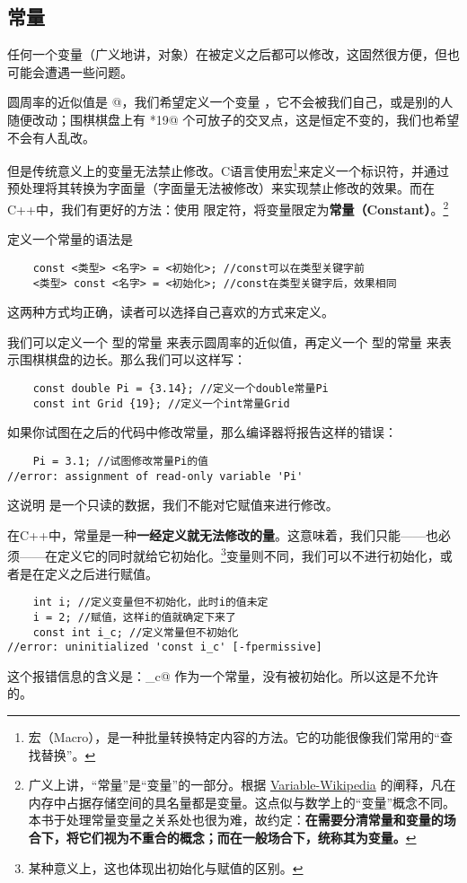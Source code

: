 \subsection*{常量}
任何一个变量（广义地讲，对象）在被定义之后都可以修改，这固然很方便，但也可能会遭遇一些问题。\par
圆周率的近似值是 @，我们希望定义一个变量 \lstinline@Pi@，它不会被我们自己，或是别的人随便改动；围棋棋盘上有 *19@ 个可放子的交叉点，这是恒定不变的，我们也希望不会有人乱改。\par
但是传统意义上的变量无法禁止修改。C语言使用宏\footnote{宏（Macro），是一种批量转换特定内容的方法。它的功能很像我们常用的``查找替换''。}来定义一个标识符，并通过预处理将其转换为字面量（字面量无法被修改）来实现禁止修改的效果。而在C++中，我们有更好的方法：使用 \lstinline@const@ 限定符，将变量限定为\textbf{常量（Constant）}。\footnote{广义上讲，``常量''是``变量''的一部分。根据 \href{https://en.wikipedia.org/wiki/Variable_(computer_science)}{Variable-Wikipedia} 的阐释，凡在内存中占据存储空间的具名量都是变量。这点似与数学上的``变量''概念不同。本书于处理常量变量之关系处也很为难，故约定：\textbf{在需要分清常量和变量的场合下，将它们视为不重合的概念；而在一般场合下，统称其为变量。}}\par
定义一个常量的语法是
\begin{lstlisting}
    const <类型> <名字> = <初始化>; //const可以在类型关键字前
    <类型> const <名字> = <初始化>; //const在类型关键字后，效果相同
\end{lstlisting}
这两种方式均正确，读者可以选择自己喜欢的方式来定义。\par
我们可以定义一个 \lstinline@double@ 型的常量 \lstinline@Pi@ 来表示圆周率的近似值，再定义一个 \lstinline@int@ 型的常量 \lstinline@Grid@ 来表示围棋棋盘的边长。那么我们可以这样写：
\begin{lstlisting}
    const double Pi = {3.14}; //定义一个double常量Pi
    const int Grid {19}; //定义一个int常量Grid
\end{lstlisting}
如果你试图在之后的代码中修改常量，那么编译器将报告这样的错误：
\begin{lstlisting}
    Pi = 3.1; //试图修改常量Pi的值
//error: assignment of read-only variable 'Pi'
\end{lstlisting}
这说明 \lstinline@Pi@ 是一个只读的数据，我们不能对它赋值来进行修改。\par
在C++中，常量是一种\textbf{一经定义就无法修改的量}。这意味着，我们只能——也必须——在定义它的同时就给它初始化。\footnote{某种意义上，这也体现出初始化与赋值的区别。}变量则不同，我们可以不进行初始化，或者是在定义之后进行赋值。
\begin{lstlisting}
    int i; //定义变量但不初始化，此时i的值未定
    i = 2; //赋值，这样i的值就确定下来了
    const int i_c; //定义常量但不初始化
//error: uninitialized 'const i_c' [-fpermissive]
\end{lstlisting}
这个报错信息的含义是：\lstinline@i_c@ 作为一个常量，没有被初始化。所以这是不允许的。\par
